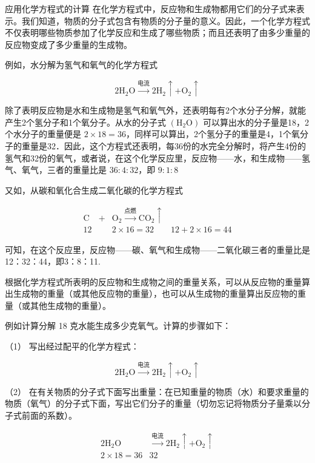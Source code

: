 应用化学方程式的计算
在化学方程式中，反应物和生成物都用它们的分子式来表示。我们知道，物质的分子式包含有物质的分子量的意义。因此，一个化学方程式不仅表明哪些物质参加了化学反应和生成了哪些物质；而且还表明了由多少重量的反应物变成了多少重量的生成物。

例如，水分解为氢气和氧气的化学方程式

\[
2 \mathrm{H}_{2} \mathrm{O} \xrightarrow {\text{电流}} 2 \mathrm{H}_{2} \uparrow + \mathrm{O}_{2} \uparrow
\]

除了表明反应物是水和生成物是氢气和氧气外，还表明每有2个水分子分解，就能产生2个氢分子和1个氧分子。从水的分子式
\((\mathrm{H}_2\mathrm{O})\) 可以算出水的分子量是18，2个水分子的重量便是
\(2\times 18 = 36\)，同样可以算出，2个氢分子的重量是4，1个氧分子的重量是32．因此，这个方程式还表明，每36份的水完全分解时，将产生4份的氢气和32份的氧气，或者说，在这个化学反应里，反应物------水，和生成物------氢气、氧气，三者的重量比是
\(36:4:32\)，即 \(9:1:8\)

又如，从碳和氧化合生成二氧化碳的化学方程式

\[
\begin{array}{rcl}\mathrm{C}&+&\mathrm{O}_{2}\xrightarrow{\text{点燃}}\mathrm{CO}_{2}\uparrow\\12&&2\times16=32\qquad 12+2\times16=44\end{array}
\]

可知，在这个反应里，反应物------碳、氧气和生成物------二氧化碳三者的重量比是12：32：44，即3：8：11.

根据化学方程式所表明的反应物和生成物之间的重量关系，可以从反应物的重量算出生成物的重量（或其他反应物的重量），也可以从生成物的重量算出反应物的重量（或其他生成物的重量）。

例如计算分解 18 克水能生成多少克氧气。计算的步骤如下：

（1） 写出经过配平的化学方程式：

\[
2 \mathrm{H}_{2} \mathrm{O} \xrightarrow {\text{电流}} 2 \mathrm{H}_{2} \uparrow + \mathrm{O}_{2} \uparrow
\]

（2）
在有关物质的分子式下面写出重量：在已知重量的物质（水）和要求重量的物质（氧气）的分子式下面，写出它们分子的重量（切勿忘记将物质分子量乘以分子式前面的系数）。

\[
\begin{array}{cc} 2 \mathrm{H}_{2} \mathrm{O} & \xrightarrow {\text{电流}} 2 \mathrm{H}_{2} \uparrow + \mathrm{O}_{2} \uparrow \\ 2 \times 18 = 36 & 32 \end{array}
\]

